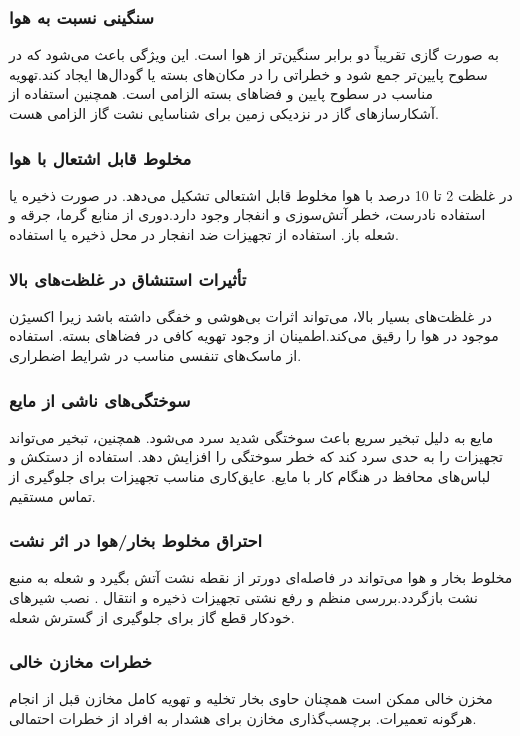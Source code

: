 \subsubsection{سنگینی نسبت به هوا}
به صورت گازی تقریباً دو برابر سنگین‌تر از هوا است. این ویژگی باعث می‌شود که در سطوح پایین‌تر جمع شود و خطراتی را در مکان‌های بسته یا گودال‌ها ایجاد کند.تهویه مناسب در سطوح پایین و فضاهای بسته الزامی است.
همچنین استفاده از آشکارسازهای گاز در نزدیکی زمین برای شناسایی نشت گاز الزامی هست.
\subsubsection{مخلوط قابل اشتعال  با هوا}
در غلظت 2 تا 10 درصد با هوا مخلوط قابل اشتعالی تشکیل می‌دهد. در صورت ذخیره یا استفاده نادرست، خطر آتش‌سوزی و انفجار وجود دارد.دوری از منابع گرما، جرقه و شعله باز.
استفاده از تجهیزات ضد انفجار در محل ذخیره یا استفاده.
\subsubsection{تأثیرات استنشاق در غلظت‌های بالا}
در غلظت‌های بسیار بالا، 
 می‌تواند اثرات بی‌هوشی و خفگی داشته باشد زیرا اکسیژن موجود در هوا را رقیق می‌کند.اطمینان از وجود تهویه کافی در فضاهای بسته.
 استفاده از ماسک‌های تنفسی مناسب در شرایط اضطراری.
\subsubsection{سوختگی‌های ناشی از مایع}
 مایع به دلیل تبخیر سریع باعث سوختگی شدید سرد می‌شود. همچنین، تبخیر می‌تواند تجهیزات را به حدی سرد کند که خطر سوختگی را افزایش دهد.
 استفاده از دستکش و لباس‌های محافظ در هنگام کار با 
  مایع.
 عایق‌کاری مناسب تجهیزات برای جلوگیری از تماس مستقیم.
\subsubsection{احتراق مخلوط بخار/هوا در اثر نشت}
مخلوط بخار 
و هوا می‌تواند در فاصله‌ای دورتر از نقطه نشت آتش بگیرد و شعله به منبع نشت بازگردد.بررسی منظم و رفع نشتی تجهیزات ذخیره و انتقال .
نصب شیرهای خودکار قطع گاز برای جلوگیری از گسترش شعله.
\subsubsection{خطرات مخازن خالی}
مخزن خالی
  ممکن است همچنان حاوی بخار
تخلیه و تهویه کامل مخازن قبل از انجام هرگونه تعمیرات.
برچسب‌گذاری مخازن برای هشدار به افراد از خطرات احتمالی.
